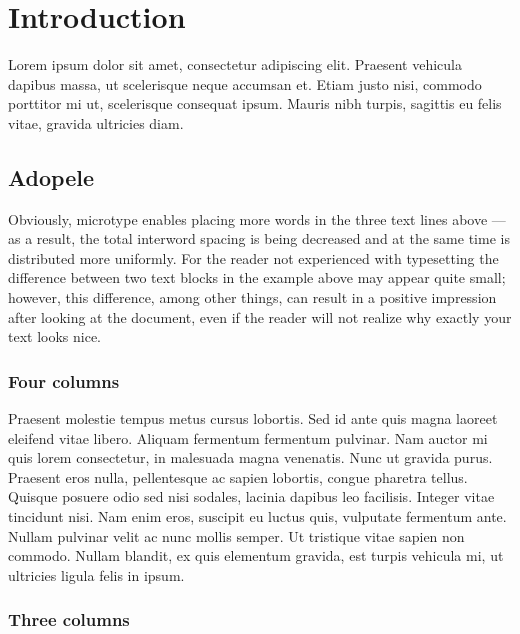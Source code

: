 \documentclass[a4paper,11pt]{report}
\begin{document}
\setcounter{chapter}{1}
\chapter{Introduction}

{\color{mediumpurple} Lorem ipsum dolor sit amet}, consectetur adipiscing elit.
{\color{orangered} Praesent vehicula dapibus massa, ut scelerisque neque accumsan et}.
Etiam justo nisi, commodo porttitor mi ut, scelerisque consequat ipsum. Mauris nibh turpis,
sagittis eu felis vitae, gravida ultricies diam.

\section{Adopele}

Obviously, microtype enables placing more words in the three text lines above — as a result,
the total interword spacing is being decreased and at the same time is distributed more uniformly.
For the reader not experienced with typesetting the difference between two text blocks in the example
above may appear quite small; however, this difference, among other things, can result in a positive
impression after looking at the document, even if the reader will not realize why exactly your text looks nice.

\subsection{Four columns}
\begin{multicols}{4}
  Praesent molestie tempus metus cursus lobortis. Sed id ante quis magna laoreet eleifend vitae libero.
  Aliquam fermentum fermentum pulvinar. Nam auctor mi quis lorem consectetur, in malesuada magna venenatis. Nunc ut gravida purus.
  Praesent eros nulla, pellentesque ac sapien lobortis, congue pharetra tellus. Quisque posuere odio sed nisi sodales,
  lacinia dapibus leo facilisis.
  Integer vitae tincidunt nisi. Nam enim eros, suscipit eu luctus quis, vulputate fermentum ante.
  Nullam pulvinar velit ac nunc mollis semper. Ut tristique vitae sapien non commodo. Nullam blandit, ex quis elementum gravida, est
  turpis vehicula mi, ut ultricies ligula felis in ipsum.
\end{multicols}

\subsection{Three columns}
\end{document}
